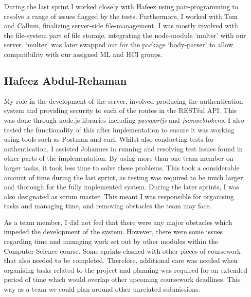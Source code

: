 During the last sprint I worked closely with Hafeez using pair-programming to resolve a range of issues flagged by the tests. Furthermore, I worked with Tom and Callum, finalizing server-side file-management. I was mostly involved with the file-system part of file storage, integrating the node-module `multer' with our server. `multer' was later swapped out for the package `body-parser' to allow compatibility with our assigned ML and HCI groups.
\subsection{Hafeez Abdul-Rehaman}
My role in the development of the server, involved producing the authentication system and providing security to each of the routes in the RESTful API. This was done through node.js libraries including \textit{passportjs} and \textit{jsonwebtokens}. I also tested the functionality of this after implementation to ensure it was working using tools such as Postman and curl. Whilst also conducting tests for authentication, I assisted Johannes in running and resolving test issues found in other parts of the implementation. By using more than one team member on larger tasks, it took less time to solve these problems. This took a considerable amount of time during the last sprint, as testing was required to be much larger and thorough for the fully implemented system. During the later sprints, I was also designated as scrum master. This meant I was responsible for organising tasks and managing time, and removing obstacles the team may face. 

As a team member, I did not feel that there were any major obstacles which impeded the development of the system. However, there were some issues regarding time and managing work set out by other modules within the Computer Science course. Some sprints clashed with other pieces of coursework that also needed to be completed. Therefore, additional care was needed when organising tasks related to the project and planning was required for an extended period of time which would overlap other upcoming coursework deadlines. This way as a team we could plan around other unrelated submissions.